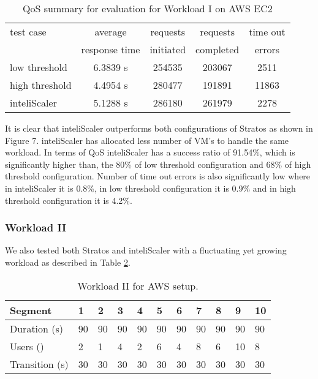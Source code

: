 \begin{table}[h!]
\centering
\caption{QoS summary for evaluation for Workload I on AWS EC2}
\label{table:analysis_qos_workload_3}
\begin{tabular}{|l|c|c|c|c|}
\hline

test case & average   & requests  & requests   & time out  \\
& response time & initiated & completed & errors\\ \hline

low threshold & 6.3839 s & 254535 & 203067 & 2511\\ \hline

high threshold & 4.4954 s & 280477 & 191891  & 11863\\ \hline

inteliScaler & 5.1288 s & 286180 & 261979  & 2278\\ \hline

\end{tabular}
\end{table}

It is clear that inteliScaler outperforms both configurations of Stratos as shown in Figure 7. inteliScaler has allocated less number of VM's to handle the same workload. In terms of QoS inteliScaler has a success ratio of 91.54\%, which is significantly higher than, the 80\% of low threshold configuration and 68\% of high threshold configuration. Number of time out errors is also significantly low where in inteliScaler it is  0.8\%, in low threshold configuration it is 0.9\%  and in high threshold configuration it is  4.2\%. 

\subsubsection{Workload II}
We also tested both Stratos and inteliScaler with a fluctuating yet growing workload as described in Table \ref{table:workload_5}.
\begin{table}[h!]
\centering
\caption{Workload II for AWS setup.}
\label{table:workload_5}
\begin{tabular}{|l|l|l|l|l|l|l|l|l|l|l|}
\hline
Segment & 1 & 2 & 3 & 4 & 5 & 6 & 7 & 8 & 9 & 10\\ \hline
Duration (s) & 90 & 90 & 90 & 90 & 90 & 90 & 90 & 90 & 90 & 90 \\ \hline
Users (\times100) & 2 & 1 & 4 & 2 & 6 & 4 & 8 & 6 & 10 & 8   \\ \hline
Transition (s) & 30 & 30 & 30 & 30 & 30 & 30 & 30 & 30 & 30 & 30  \\ \hline
\end{tabular}
\end{table}